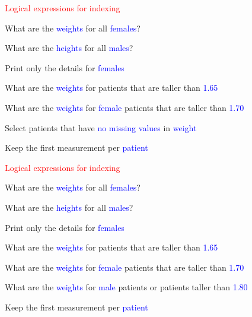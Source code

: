\documentclass{presentatiesmetlogo}
\begin{document}
\eitemt
\eitem
\bitem
\item \textcolor{red}{Logical expressions for indexing}
\bitemt
\item What are the \textcolor{blue}{weights} for all \textcolor{blue}{females}?
\item What are the \textcolor{blue}{heights} for all \textcolor{blue}{males}?
\item Print only the details for \textcolor{blue}{females}
\item What are the \textcolor{blue}{weights} for patients that are taller than \textcolor{blue}{1.65}
\item What are the \textcolor{blue}{weights} for \textcolor{blue}{female} patients that are taller than \textcolor{blue}{1.70}
\item {}
\item Select patients that have \textcolor{blue}{no missing values} in \textcolor{blue}{weight}
\item Keep the first measurement per \textcolor{blue}{patient}
\eitemt
\eitem
\bitem
\item \textcolor{red}{Logical expressions for indexing}
\bitemt
\item What are the \textcolor{blue}{weights} for all \textcolor{blue}{females}?
\item What are the \textcolor{blue}{heights} for all \textcolor{blue}{males}?
\item Print only the details for \textcolor{blue}{females}
\item What are the \textcolor{blue}{weights} for patients that are taller than \textcolor{blue}{1.65}
\item What are the \textcolor{blue}{weights} for \textcolor{blue}{female} patients that are taller than \textcolor{blue}{1.70}
\item What are the \textcolor{blue}{weights} for \textcolor{blue}{male} patients or patients taller than \textcolor{blue}{1.80}
\item {}
\item Keep the first measurement per \textcolor{blue}{patient}
\eitemt
\eitem
\end{document}
